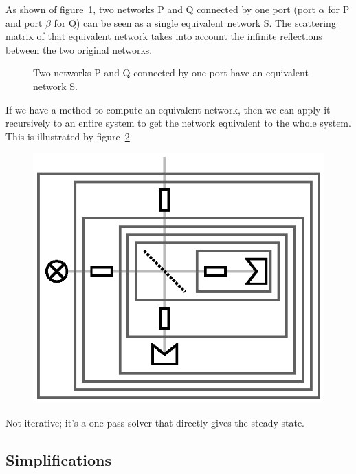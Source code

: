 \documentclass[a4paper,11pt]{article}
\begin{document}
As shown of figure~\ref{fig:cascading}, two networks P and Q connected by one port (port $\alpha$ for P and port $\beta$ for Q) can be seen as a single equivalent  network S.
The scattering matrix of that equivalent network takes into account the infinite reflections between the two original networks.
\begin{figure}[hbtp]
    \centering
    
    \caption{\label{fig:cascading}Two networks P and Q connected by one port have an equivalent network S.}
\end{figure}

If we have a method to compute an equivalent network, then we can apply it recursively to an entire system to get the network equivalent to the whole system.
This is illustrated by figure~\ref{fig:cascading_example}
\begin{figure}[hbtp]
    \centering
    \includegraphics{cascading_example}
    \caption{\label{fig:cascading_example}}
\end{figure}

Not iterative; it's a one-pass solver that directly gives the steady state.


\subsection{Simplifications}
\end{document}
